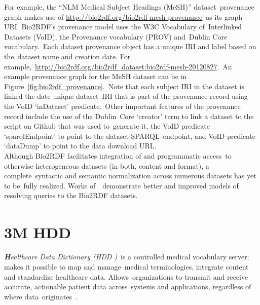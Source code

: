 \documentclass[DIV=calc, paper=a4, fontsize=12pt, onecolumn]{scrartcl}	 %
\newcommand{\initial}[1]{ %
\lettrine[lines=3,lhang=0.3,nindent=0em,slope=0em]{
\color{DarkBlue}
{\textbf{\textit{#1}}}}{}}
\begin{document}
  \noindent For example, the ``NLM Medical Subject Headings (MeSH)'' dataset\
  provenance graph makes use of \url{http://bio2rdf.org/bio2rdf-mesh-provenance}\
  as its graph URI. Bio2RDF's provenance model uses the W3C Vocabulary of\
  Interlinked Datasets (VoID), the Provenance vocabulary (PROV) and\
  Dublin Core vocabulary.\
  Each dataset provenance object has a unique IRI and label based on the\
  dataset name and creation date. For example,\
  \url{http://bio2rdf.org/bio2rdf_dataset:bio2rdf-mesh-20120827}.\
  An example provenance graph for the MeSH dataset can be in Figure~\ref{fig:bio2rdf_provenance}.\
  Note that each subject IRI in the dataset is linked the date-unique dataset\
  IRI that is part of the provenance record using the VoID `inDataset' predicate.\
  Other important features of the provenance record include the use of the Dublin\
  Core `creator' term to link a dataset to the script on Github that was used to\
  generate it, the VoID predicate `sparqlEndpoint' to point to the dataset SPARQL\
  endpoint, and VoID predicate `dataDump' to point to the data download URL.\\
  
  \noindent Although Bio2RDF facilitates integration of and programmatic access\
  to otherwise heterogeneous datasets (in both, content and format), a complete\
  syntactic and semantic normalization across numerous datasets has yet to be\
  fully realized. Works of~\citep{ansell_model_2011, callahan_ontology-based_2013}\
  demonstrate better and improved models of resolving queries to the Bio2RDF datasets.\\


  \section[3M\textsuperscript{\texttrademark} Healthcare Data Dictionary (HDD)]
  {3M HDD\textsuperscript{\texttrademark}}
  \label{sec:hdd}
  
  \initial{H}\textit{ealthcare Data Dictionary (HDD )}\
  is a controlled medical vocabulary server; makes it possible to map and manage\
  medical terminologies, integrate content and standardize healthcare data. Allows\
  organizations to transmit and receive accurate, actionable patient data across\
  systems and applications, regardless of where data\
  originates~\citep{_3M_Healthcare_Data_Dictionary_2013}.\\
  
\end{document}
